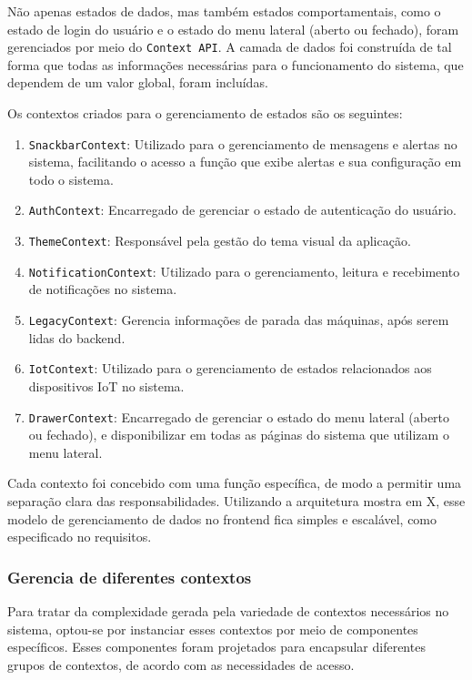 Não apenas estados de dados, mas também estados comportamentais, como o estado de login do usuário e o estado do menu lateral (aberto ou fechado), foram gerenciados por meio do \texttt{Context API}. A camada de dados foi construída de tal forma que todas as informações necessárias para o funcionamento do sistema, que dependem de um valor global, foram incluídas.

Os contextos criados para o gerenciamento de estados são os seguintes:
\begin{enumerate}
    \item \texttt{SnackbarContext}: Utilizado para o gerenciamento de mensagens e alertas no sistema, facilitando o acesso a função que exibe alertas e sua configuração em todo o sistema.
    \item \texttt{AuthContext}: Encarregado de gerenciar o estado de autenticação do usuário. %
    \item \texttt{ThemeContext}: Responsável pela gestão do tema visual da aplicação. %
    \item \texttt{NotificationContext}: Utilizado para o gerenciamento, leitura e recebimento de notificações no sistema.
    \item \texttt{LegacyContext}: Gerencia informações de parada das máquinas, após serem lidas do backend.%
    \item \texttt{IotContext}: Utilizado para o gerenciamento de estados relacionados aos dispositivos IoT no sistema.
    \item \texttt{DrawerContext}: Encarregado de gerenciar o estado do menu lateral (aberto ou fechado), e disponibilizar em todas as páginas do sistema que utilizam o menu lateral.
\end{enumerate}

Cada contexto foi concebido com uma função específica, de modo a permitir uma separação clara das responsabilidades. Utilizando a arquitetura mostra em X, esse modelo de gerenciamento de dados no frontend fica simples e escalável, como especificado no requisitos.%

\subsubsection{Gerencia de diferentes contextos}\label{subsubsec:difContexts}
Para tratar da complexidade gerada pela variedade de contextos necessários no sistema, optou-se por instanciar esses contextos por meio de componentes específicos. Esses componentes foram projetados para encapsular diferentes grupos de contextos, de acordo com as necessidades de acesso.

